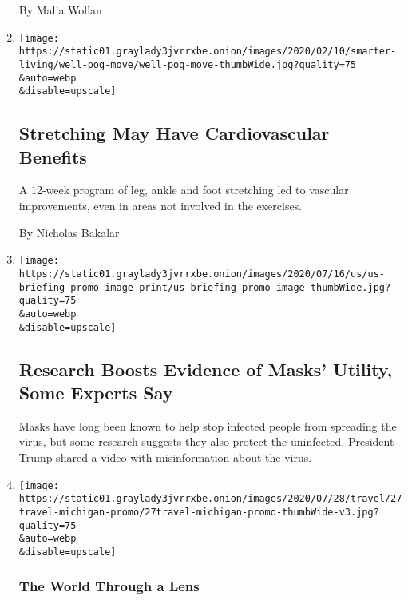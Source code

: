 \begin{enumerate}
  By Malia Wollan
\item
  \href{/2020/07/27/well/move/stretching-heart-cardiovascular-health.html}{}

  \texttt{[image: https://static01.graylady3jvrrxbe.onion/images/2020/02/10/smarter-living/well-pog-move/well-pog-move-thumbWide.jpg?quality=75\\\&auto=webp\\\&disable=upscale]}

  \hypertarget{stretching-may-have-cardiovascular-benefits}{%
  \subsection{Stretching May Have Cardiovascular
  Benefits}\label{stretching-may-have-cardiovascular-benefits}}

  A 12-week program of leg, ankle and foot stretching led to vascular
  improvements, even in areas not involved in the exercises.

  By Nicholas Bakalar
\item
  \href{/2020/07/27/world/coronavirus-covid-19.html}{}

  \texttt{[image: https://static01.graylady3jvrrxbe.onion/images/2020/07/16/us/us-briefing-promo-image-print/us-briefing-promo-image-thumbWide.jpg?quality=75\\\&auto=webp\\\&disable=upscale]}

  \hypertarget{research-boosts-evidence-of-masks-utility-some-experts-say}{%
  \subsection{Research Boosts Evidence of Masks' Utility, Some Experts
  Say}\label{research-boosts-evidence-of-masks-utility-some-experts-say}}

  Masks have long been known to help stop infected people from spreading
  the virus, but some research suggests they also protect the
  uninfected. President Trump shared a video with misinformation about
  the virus.
\item
  \href{/2020/07/27/travel/moose-michigan-isle-royale.html}{}

  \texttt{[image: https://static01.graylady3jvrrxbe.onion/images/2020/07/28/travel/27travel-michigan-promo/27travel-michigan-promo-thumbWide-v3.jpg?quality=75\\\&auto=webp\\\&disable=upscale]}

  \hypertarget{the-world-through-a-lens}{%
  \subsubsection{The World Through a
  Lens}\label{the-world-through-a-lens}}


\end{enumerate}
